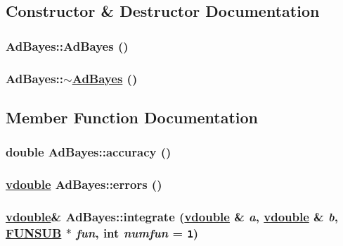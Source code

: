 \subsection{Constructor \& Destructor Documentation}
\hypertarget{classAdBayes_a0}{
\subsubsection[AdBayes]{\setlength{\rightskip}{0pt plus 5cm}Ad\-Bayes::Ad\-Bayes ()}}
\label{classAdBayes_a0}


\hypertarget{classAdBayes_a1}{
\subsubsection[$\sim$AdBayes]{\setlength{\rightskip}{0pt plus 5cm}Ad\-Bayes::$\sim$\hyperlink{classAdBayes}{Ad\-Bayes} ()}}
\label{classAdBayes_a1}




\subsection{Member Function Documentation}
\hypertarget{classAdBayes_a8}{
\subsubsection[accuracy]{\setlength{\rightskip}{0pt plus 5cm}double Ad\-Bayes::accuracy ()}}
\label{classAdBayes_a8}


\hypertarget{classAdBayes_a13}{
\subsubsection[errors]{\setlength{\rightskip}{0pt plus 5cm}\hyperlink{PoissonGammaFit_8hpp_a0}{vdouble} Ad\-Bayes::errors ()}}
\label{classAdBayes_a13}


\hypertarget{classAdBayes_a2}{
\subsubsection[integrate]{\setlength{\rightskip}{0pt plus 5cm}\hyperlink{PoissonGammaFit_8hpp_a0}{vdouble}\& Ad\-Bayes::integrate (\hyperlink{PoissonGammaFit_8hpp_a0}{vdouble} \& {\em a}, \hyperlink{PoissonGammaFit_8hpp_a0}{vdouble} \& {\em b}, \hyperlink{AdBayes_8hpp_a3}{FUNSUB} $\ast$ {\em fun}, int {\em numfun} = {\tt 1})}}
\label{classAdBayes_a2}


